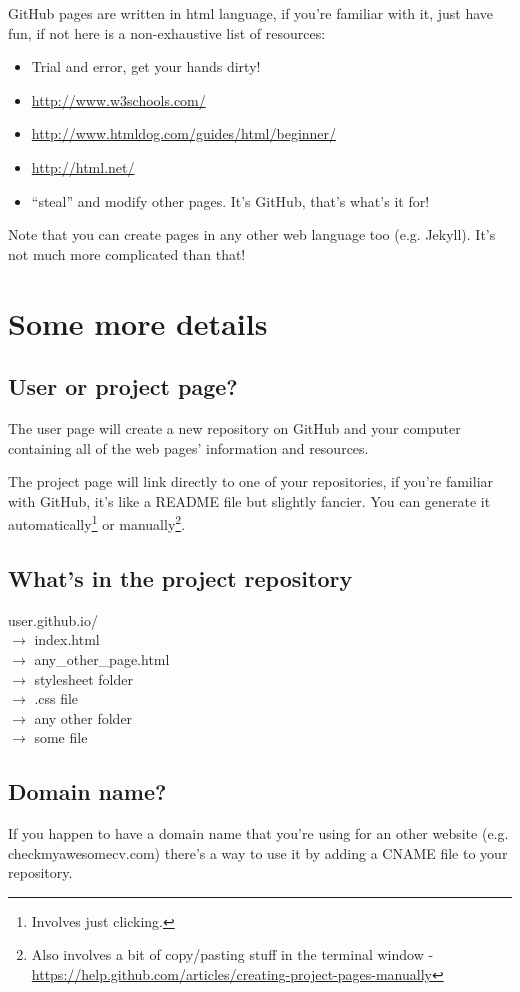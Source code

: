 \documentclass[a4paper,11pt]{article}
\begin{document}
GitHub pages are written in html language, if you're familiar with it, just have fun, if not here is a non-exhaustive list of resources:
\par
\begin{itemize}
    \item{Trial and error, get your hands dirty!}
    \item{\url{http://www.w3schools.com/}}
    \item{\url{http://www.htmldog.com/guides/html/beginner/}}
    \item{\url{http://html.net/}}
    \item{``steal'' and modify other pages. It's GitHub, that's what's it for!}
\end{itemize}
Note that you can create pages in any other web language too (e.g. Jekyll).
It's not much more complicated than that!

\newpage

\section{Some more details}
\subsection{User or project page?}
\setlength{\parindent}{5ex}
The user page will create a new repository on GitHub and your computer containing all of the web pages' information and resources.

The project page will link directly to one of your repositories, if you're familiar with GitHub, it's like a README file but slightly fancier.
You can generate it automatically\footnote{Involves just clicking.} or manually\footnote{Also involves a bit of copy/pasting stuff in the terminal window - \url{https://help.github.com/articles/creating-project-pages-manually}}.
\par

\subsection{What's in the project repository}

\begin{spacing}{1.1}
user.github.io/ \\
     \qquad  $\rightarrow$ index.html \\
     \qquad  $\rightarrow$ any\_other\_page.html \\
     \qquad  $\rightarrow$ stylesheet folder \\
     \quad \quad \qquad $\rightarrow$ .css file \\
     \qquad  $\rightarrow$ any other folder \\
     \quad \quad \qquad $\rightarrow$ some file \\
\end{spacing}

\subsection{Domain name?}
If you happen to have a domain name that you're using for an other website (e.g. checkmyawesomecv.com) there's a way to use it by adding a CNAME file to your repository.
    
\end{document}
